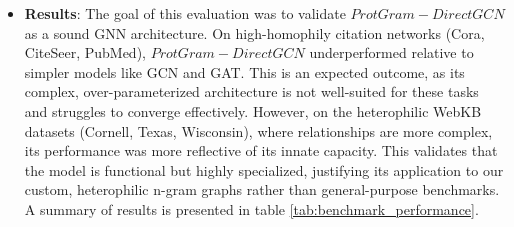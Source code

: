 \documentclass[utf8]{article}
\begin{document}
\begin{itemize}
		\item \textbf{Results}: The goal of this evaluation was to validate $ProtGram-DirectGCN$ as a sound GNN architecture. On high-homophily citation networks (Cora, CiteSeer, PubMed), $ProtGram-DirectGCN$ underperformed relative to simpler models like GCN and GAT. This is an expected outcome, as its complex, over-parameterized architecture is not well-suited for these tasks and struggles to converge effectively. However, on the heterophilic WebKB datasets (Cornell, Texas, Wisconsin), where relationships are more complex, its performance was more reflective of its innate capacity. This validates that the model is functional but highly specialized, justifying its application to our custom, heterophilic n-gram graphs rather than general-purpose benchmarks. A summary of results is presented in table \ref{tab:benchmark_performance}.
	\end{itemize}
	
\end{document}
